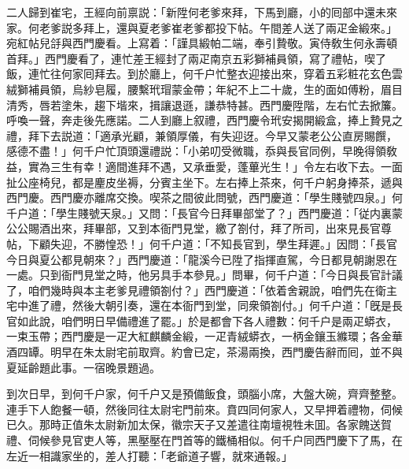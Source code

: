 二人歸到崔宅，王經向前禀説：「新陞何老爹來拜，下馬到廳，小的囘部中還未來家。何老爹説多拜上，還與夏老爹崔老爹都投下帖。午間差人送了兩疋金緞來。」宛紅帖兒㧱與西門慶看。上寫着：「謹具緞帕二端，奉引贄敬。寅侍敎生何永壽頓首拜。」西門慶看了，連忙差王經封了兩疋南京五彩獅補員領，寫了禮帖，喫了飯，連忙往何家囘拜去。到於廳上，何千户忙整衣迎接出來，穿着五彩粧花玄色雲絨獅補員領，烏紗皂履，腰繫玳瑁蒙金帶；年紀不上二十歲，生的面如傅粉，眉目清秀，唇若塗朱，趨下堦來，揖讓退遜，謙恭特甚。西門慶陞階，左右忙去掀簾。呼喚一聲，奔走後先應諾。二人到廳上叙禮，西門慶令玳安揭開緞盒，捧上贄見之禮，拜下去説道：「適承光顧，兼領厚儀，有失迎迓。今早又蒙老公公直房賜饌，感德不盡！」何千户忙頂頭還禮説：「小弟叨受微職，忝與長官同例，早晚得領敎益，實為三生有幸！適間進拜不遇，又承垂愛，蓬蓽光生！」令左右收下去。一面扯公座椅兒，都是麈皮坐褥，分賓主坐下。左右捧上茶來，何千户躬身捧茶，遞與西門慶。西門慶亦離席交換。喫茶之間彼此問號，西門慶道：「學生賤號四泉。」何千户道：「學生賤號天泉。」又問：「長官今日拜畢部堂了？」西門慶道：「従内裏蒙公公賜酒出來，拜畢部，又到本衙門見堂，繳了劄付，拜了所司，出來見長官尊帖，下顧失迎，不勝惶恐！」何千户道：「不知長官到，學生拜遲。」因問：「長官今日與夏公都見朝來？」西門慶道：「龍溪今已陞了指揮直駕，今日都見朝謝恩在一處。只到衙門見堂之時，他另具手本參見。」問畢，何千户道：「今日與長官計議了，咱們幾時與本主老爹見禮領劄付？」西門慶道：「依着舍親說，咱們先在衛主宅中進了禮，然後大朝引奏，還在本衙門到堂，同衆領劄付。」何千户道：「旣是長官如此說，咱們明日早備禮進了罷。」於是都會下各人禮數：何千户是兩疋蟒衣，一束玉帶；西門慶是一疋大紅麒麟金緞，一疋青絨蟒衣，一柄金鑲玉縧環；各金華酒四罈。明早在朱太尉宅前取齊。約會已定，茶湯兩換，西門慶告辭而囘，並不與夏延齡題此事。一宿晚景題過。

到次日早，到何千户家，何千户又是預備飯食，頭腦小席，大盤大碗，齊齊整整。連手下人飽餐一頓，然後同往太尉宅門前來。賁四同何家人，又早押着禮物，伺候已久。那時正值朱太尉新加太保，徽宗天子又差遣往南壇視牲未囬。各家餽送賀禮、伺候參見官吏人等，黑壓壓在門首等的鐵桶相似。何千户同西門慶下了馬，在左近一相識家坐的，差人打聽：「老爺道子響，就來通報。」


